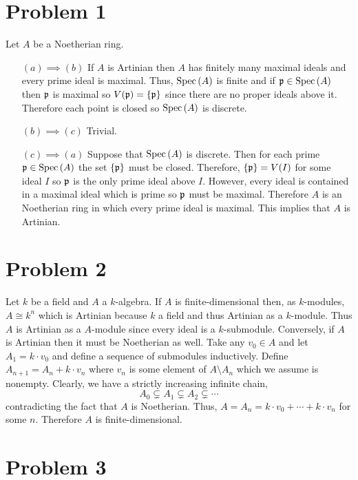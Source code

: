 \documentclass[12pt]{extarticle}
\begin{document}
 
\section{Problem 1}
Let $A$ be a Noetherian ring. 
\begin{enumerate}
\item[$(a) \implies (b)$]
If $A$ is Artinian then $A$ has finitely many maximal ideals and every prime ideal is maximal. Thus, $\mathrm{Spec}\left( A \right)$ is finite and if $\mathfrak{p} \in \mathrm{Spec}\left( A \right)$ then $\mathfrak{p}$ is maximal so $V(\mathfrak{p}) = \{ \mathfrak{p} \}$ since there are no proper ideals above it. Therefore each point is closed so $\mathrm{Spec}\left( A \right)$ is discrete. 
\item[$(b) \implies (c)$]
Trivial.
\item[$(c) \implies (a)$]
Suppose that $\mathrm{Spec}\left( A \right)$ is discrete. Then for each prime $\mathfrak{p} \in \mathrm{Spec}\left( A \right)$ the set $\{ \mathfrak{p} \}$ must be closed. Therefore, $\{ \mathfrak{p} \} = V(I)$ for some ideal $I$ so $\mathfrak{p}$ is the only prime ideal above $I$. However, every ideal is contained in a maximal ideal which is prime so $\mathfrak{p}$ must be maximal. Therefore $A$ is an Noetherian ring in which every prime ideal is maximal. This implies that $A$ is Artinian. 
\end{enumerate}

\section{Problem 2}

Let $k$ be a field and $A$ a $k$-algebra. If $A$ is finite-dimensional then, as $k$-modules, $A \cong k^n$ which is Artinian because $k$ a field and thus Artinian as a $k$-module. Thus $A$ is Artinian as a $A$-module since every ideal is a $k$-submodule. Conversely, if $A$ is Artinian then it must be Noetherian as well. Take any $v_0 \in A$ and let $A_1 = k \cdot v_0$ and define a sequence of submodules inductively. Define $A_{n+1} = A_n + k \cdot v_n$ where $v_n$ is some element of $A \setminus A_n$ which we assume is nonempty. Clearly, we have a strictly increasing infinite chain,
\[ A_0 \subsetneq A_1 \subsetneq A_2 \subsetneq \cdots \]
contradicting the fact that $A$ is Noetherian. Thus, $A = A_n = k \cdot v_0 + \cdots + k \cdot v_n$ for some $n$. Therefore $A$ is finite-dimensional. 


\section{Problem 3}
\end{document}
